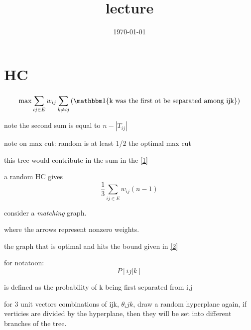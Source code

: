 \documentclass{article}
\title{lecture}
\date{\today}
\theoremstyle{definition}
\newcommand{\abs}[1]{\left| #1 \right|}
\begin{document}
\maketitle


\section{HC}
\begin{equation}
    \max \sum_{ij\in E}^{} w_{ij}\sum_{k\neq ij}^{}\left( \mathbbm 1\{\text{k was the first ot be separated among ijk}\} \right)
\end{equation}

note the second sum is equal to \(n-\abs{T_{ij}}\) \label{1}

note on max cut:
random is at least 1/2 the optimal max cut



this tree would contribute in the sum in the \ref{1}

a random HC gives 
\begin{equation}\label{2}
    \frac{1}{3}\sum_{ij\in E}^{}w_{ij}\left( n-1 \right)
\end{equation}

consider a \emph{matching} graph. 


where the arrows represent nonzero weights. 

the graph that is optimal and hits the bound given in \ref{2}


for notatoon:
\begin{equation}
    P[ij\vert k]
\end{equation}

is defined as the probability of k being first separated from i,j

for 3 unit vectors combinations of ijk, \(\theta_ijk\), draw a random hyperplane again, if verticies are divided by the hyperplane, then they will be set into different branches of the tree.
\end{document}
